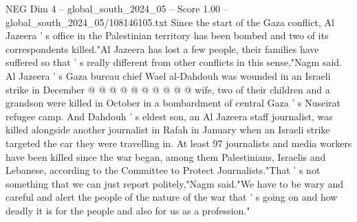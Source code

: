 \begin{textsample}{NEG Dim 4 – global\_south\_2024\_05 – Score 1.00 – global\_south\_2024\_05/108146105.txt}
Since the start of the Gaza conflict, Al Jazeera ' s office in the Palestinian territory has been bombed and two of its correspondents killed."Al Jazeera has lost a few people, their families have suffered so that ' s really different from other conflicts in this sense,"Nagm said.
Al Jazeera ' s Gaza bureau chief Wael al-Dahdouh was wounded in an Israeli strike in December @ @ @ @ @ @ @ @ @ @ wife, two of their children and a grandson were killed in October in a bombardment of central Gaza ' s Nuseirat refugee camp.
And Dahdouh ' s eldest son, an Al Jazeera staff journalist, was killed alongside another journalist in Rafah in January when an Israeli strike targeted the car they were travelling in.
At least 97 journalists and media workers have been killed since the war began, among them Palestinians, Israelis and Lebanese, according to the Committee to Protect Journalists."That ' s not something that we can just report politely,"Nagm said."We have to be wary and careful and alert the people of the nature of the war that ' s going on and how deadly it is for the people and also for us as a profession."

\end{textsample}
